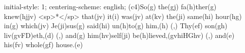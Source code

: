 initial-style: 1;
centering-scheme: english;
(c4)So(g) the(gj) fa(h)ther(g) knew(hjjv) <sp>*</sp> that(jv) it(i) was(jv) at(kv) the(ji) same(hi) hour(hg) in(g) which(jv) Je(ji)sus(g) said(hi) un(h)to(g) him,(h) (,) Thy(ef) son(gh) liv(gvFD)eth,(d) (,) and(g) him(hv)self(ji) be(h)lieved,(gvhiHGhv) (,) and(e) his(fv) whole(gf) house.(e)
